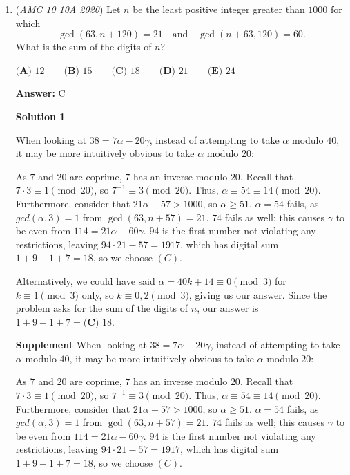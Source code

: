 \begin{enumerate}
 $\textbf{Case 4: 0 Rotation, 3 Reflections}-$ It's easy to see that this case won't yield any further valid sequences of transformations, so this solving solution won't consider it any further.

 Thus, the final answer is $6+6=\boxed{\textbf{(A) 12}}$

 \href{https://artofproblemsolving.com/videos/amc/2020amc10a/513}{https://artofproblemsolving.com/videos/amc/2020amc10a/513}

 


 


	\item (\textit{AMC 10 10A 2020}) Let $n$ be the least positive integer greater than $1000$ for which
 \[\gcd(63, n+120) =21\quad \text{and} \quad \gcd(n+63, 120)=60.\]What is the sum of the digits of $n$?


 $\textbf{(A) } 12 \qquad\textbf{(B) } 15 \qquad\textbf{(C) } 18 \qquad\textbf{(D) } 21\qquad\textbf{(E) } 24$

 \textbf{Answer: }C



\textbf{Solution 1}

When looking at $38=7\alpha-20\gamma$, instead of attempting to take $\alpha$ modulo $40$, it may be more intuitively obvious to take $\alpha$ modulo $20$:

 As $7$ and $20$ are coprime, $7$ has an inverse modulo $20$. Recall that $7 \cdot 3 \equiv 1 \pmod{20}$, so $7^{-1} \equiv 3 \pmod{20}$. Thus, $\alpha \equiv 54 \equiv 14 \pmod{20}$. Furthermore, consider that $21 \alpha -57 > 1000$, so $\alpha \geq 51$. $\alpha = 54$ fails, as $gcd( \alpha, 3) = 1$ from $\gcd(63, n + 57 ) = 21$. $74$ fails as well; this causes $\gamma$ to be even from $114 = 21\alpha - 60\gamma$. $94$ is the first number not violating any restrictions, leaving $94 \cdot 21-57 = 1917$, which has digital sum $1 + 9 + 1 + 7 = 18$, so we choose $\boxed{ (C) }$.

 Alternatively, we could have said $\alpha = 40k+14 \equiv{0} \pmod{3}$ for $k \equiv{1} \pmod{3}$ only, so $k \equiv{0,2} \pmod{3}$, giving us our answer. Since the problem asks for the sum of the digits of $n$, our answer is $1+9+1+7=\boxed{\textbf{(C) } 18}$.

 \textbf{Supplement} When looking at $38=7\alpha-20\gamma$,  instead of attempting to take $\alpha$ modulo $40$, it may be more intuitively obvious to take $\alpha$ modulo $20$:

 As $7$ and $20$ are coprime, $7$ has an inverse modulo $20$. Recall that $7 \cdot 3 \equiv 1 \pmod{20}$, so $7^{-1} \equiv 3 \pmod{20}$. Thus, $\alpha \equiv 54 \equiv 14 \pmod{20}$. Furthermore, consider that $21 \alpha -57 > 1000$, so $\alpha \geq 51$. $\alpha = 54$ fails, as $gcd( \alpha, 3) = 1$ from $\gcd(63, n + 57 ) = 21$. $74$ fails as well; this causes $\gamma$ to be even from $114 = 21\alpha - 60\gamma$. $94$ is the first number not violating any restrictions, leaving $94 \cdot 21-57 = 1917$, which has digital sum $1 + 9 + 1 + 7 = 18$, so we choose $\boxed{ (C) }$. 


\end{enumerate}
